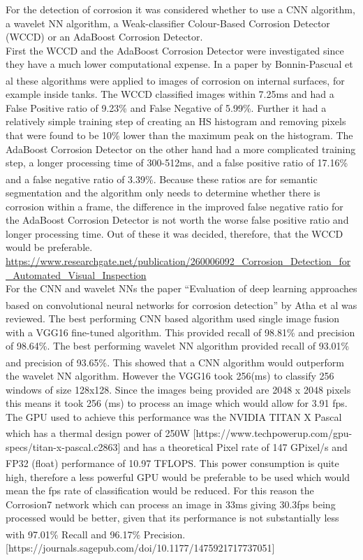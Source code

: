 \documentclass[11pt]{article}		%
\newcommand{\supercite}[1]{\textsuperscript{\cite{#1}}}		%
\begin{document}
	        For the detection of corrosion it was considered whether to use a CNN algorithm, a wavelet NN algorithm, a Weak-classifier Colour-Based Corrosion Detector (WCCD) or an AdaBoost Corrosion Detector.
	        \\
	        First the WCCD and the AdaBoost Corrosion Detector were investigated since they have a much lower computational expense. 
	        In a paper by Bonnin-Pascual et al\supercite{WCCD} these algorithms were applied to images of corrosion on internal surfaces, for example inside tanks. The WCCD classified images within 7.25ms and had a False Positive ratio of 9.23\% and False Negative of 5.99\%. Further it had a relatively simple training step of creating an HS histogram and removing pixels that were found to be 10\% lower than the maximum peak on the histogram.
	        The AdaBoost Corrosion Detector on the other hand had a more complicated training step, a longer processing time of 300-512ms, and a false positive ratio of 17.16\% and a false negative ratio of 3.39\%.\supercite{WCCD}  
	        Because these ratios are for semantic segmentation and the algorithm only needs to determine whether there is corrosion within a frame, the difference in the improved false negative ratio for the AdaBoost Corrosion Detector is not worth the worse false positive ratio and longer processing time. 
	        Out of these it was decided, therefore, that the WCCD would be preferable.  \url{https://www.researchgate.net/publication/260006092_Corrosion_Detection_for_Automated_Visual_Inspection}
	        \\
	        For the CNN and wavelet NNs the paper “Evaluation of deep learning approaches based on convolutional neural networks for corrosion detection” by Atha et al\supercite{Corrosion7}  was reviewed. The best performing CNN based algorithm used single image fusion with a VGG16 fine-tuned algorithm. This provided recall of 98.81\% and precision of 98.64\%. The best performing wavelet NN algorithm provided recall of 93.01\% and precision of 93.65\%.\supercite{Corrosion7} This showed that a CNN algorithm would outperform the wavelet NN algorithm. However the VGG16 took 256(ms) to classify 256 windows of size 128x128. Since the images being provided are 2048 x 2048 pixels this means it took 256 (ms) to process an image which would allow for 3.91 fps. The GPU used to achieve this performance was the NVIDIA TITAN X Pascal which has a thermal design power of 250W\supercite{Nvidia_Titan} [https://www.techpowerup.com/gpu-specs/titan-x-pascal.c2863] and has a theoretical Pixel rate of 147 GPixel/s and FP32 (float) performance of 10.97 TFLOPS.\supercite{Corrosion7} This power consumption is quite high, therefore a less powerful GPU would be preferable to be used which would mean the fps rate of classification would be reduced. For this reason the Corrosion7 network which can process an image in 33ms giving 30.3fps being processed would be better, given that its performance is not substantially less with 97.01\% Recall and 96.17\% Precision.\supercite{Corrosion7} [https://journals.sagepub.com/doi/10.1177/1475921717737051]
\end{document}
